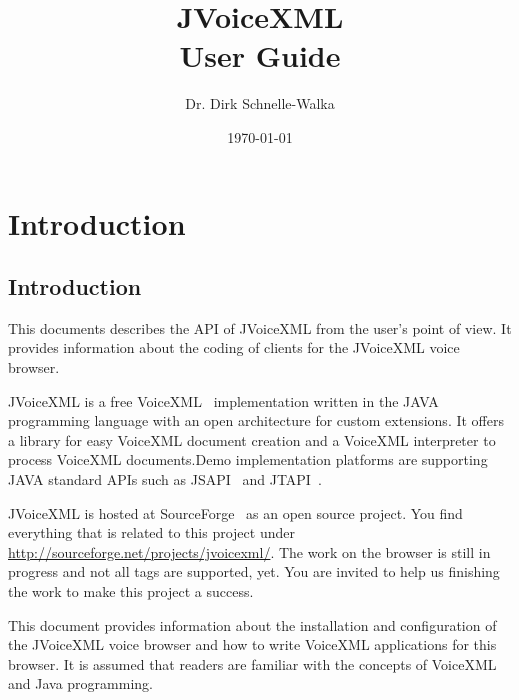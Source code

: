 \documentclass[11pt,a4paper]{book}
\title{JVoiceXML \jvxmlversion \\ User Guide}
\author{Dr. Dirk Schnelle-Walka}
\date{\today}
\begin{document}
\pagestyle{empty}

\maketitle


\pagestyle{headings}

\tableofcontents

\newpage

\listoffigures

\newpage

\listoftables

\newpage
{}

\chapter{Introduction}
\section{Introduction}
\label{sec:introduction}

This documents describes the API of JVoiceXML from the user's point of
view. It provides information about the coding of clients for
the JVoiceXML voice browser.

JVoiceXML is a free VoiceXML~\cite{w3.org:voicexml} implementation written in 
the JAVA programming language with an open architecture for custom
extensions. It offers a library for easy VoiceXML
document creation and a VoiceXML interpreter to process 
VoiceXML documents.Demo implementation platforms are supporting JAVA standard
APIs such as JSAPI~\cite{sun:jsapi} and JTAPI~\cite{sun:jsapi}.

JVoiceXML is hosted at SourceForge~\cite{sourceforge} as an open source project.
You find everything that is related to this project under
\url{http://sourceforge.net/projects/jvoicexml/}.
The work on the browser is still in progress and not all tags are
supported, yet. You are invited to help us finishing the work to make this
project a success.

This document provides information about the installation and
configuration of the JVoiceXML voice browser and how to write
VoiceXML applications for this browser.
It is assumed that readers are familiar with the concepts of
VoiceXML and Java programming.
\end{document}
